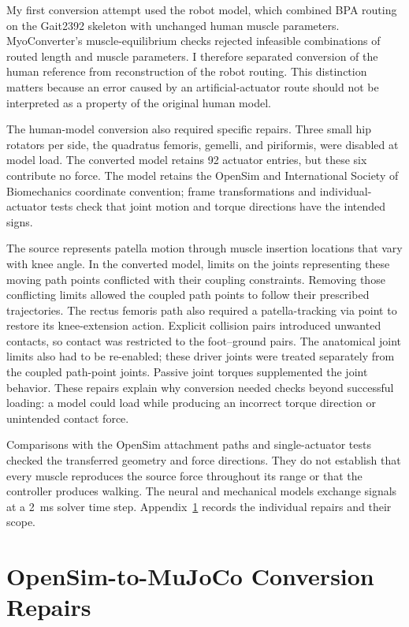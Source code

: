 \documentclass[11pt]{report}
\begin{document}
\clearpage
My first conversion attempt used the robot model, which combined BPA routing on the Gait2392 skeleton with unchanged human muscle parameters. MyoConverter's muscle-equilibrium checks rejected infeasible combinations of routed length and muscle parameters. I therefore separated conversion of the human reference from reconstruction of the robot routing. This distinction matters because an error caused by an artificial-actuator route should not be interpreted as a property of the original human model.

The human-model conversion also required specific repairs. Three small hip rotators per side, the quadratus femoris, gemelli, and piriformis, were disabled at model load. The converted model retains 92 actuator entries, but these six contribute no force. The model retains the OpenSim and International Society of Biomechanics coordinate convention; frame transformations and individual-actuator tests check that joint motion and torque directions have the intended signs.

The source represents patella motion through muscle insertion locations that vary with knee angle. In the converted model, limits on the joints representing these moving path points conflicted with their coupling constraints. Removing those conflicting limits allowed the coupled path points to follow their prescribed trajectories. The rectus femoris path also required a patella-tracking via point to restore its knee-extension action. Explicit collision pairs introduced unwanted contacts, so contact was restricted to the foot--ground pairs. The anatomical joint limits also had to be re-enabled; these driver joints were treated separately from the coupled path-point joints. Passive joint torques supplemented the joint behavior. These repairs explain why conversion needed checks beyond successful loading: a model could load while producing an incorrect torque direction or unintended contact force.

Comparisons with the OpenSim attachment paths and single-actuator tests checked the transferred geometry and force directions. They do not establish that every muscle reproduces the source force throughout its range or that the controller produces walking. The neural and mechanical models exchange signals at a \qty{2}{\milli\second} solver time step. Appendix~\ref{sec:app_conversion_repairs} records the individual repairs and their scope.


\clearpage
\section{OpenSim-to-MuJoCo Conversion Repairs}\label{sec:app_conversion_repairs}
\end{document}
